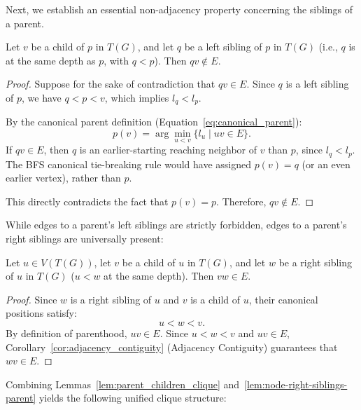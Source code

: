 Next, we establish an essential non-adjacency property concerning the siblings of a parent.

\begin{lemma}
\label{lem:child-left-sibling}
Let $v$ be a child of $p$ in $T(G)$, and let $q$ be a left sibling of $p$ in $T(G)$ (i.e., $q$ is at the same depth as $p$, with $q < p$). Then $qv \notin E$.
\end{lemma}
\begin{proof}
Suppose for the sake of contradiction that $qv \in E$. Since $q$ is a left sibling of $p$, we have $q < p < v$, which implies $l_q < l_p$. 

By the canonical parent definition (Equation~\eqref{eq:canonical_parent}):
\[
    p(v) = \arg\min_{u < v} \{ l_u \mid uv \in E \}.
\]
If $qv \in E$, then $q$ is an earlier-starting reaching neighbor of $v$ than $p$, since $l_q < l_p$. The BFS canonical tie-breaking rule would have assigned $p(v) = q$ (or an even earlier vertex), rather than $p$. 

This directly contradicts the fact that $p(v) = p$. Therefore, $qv \notin E$.
\end{proof}

While edges to a parent's left siblings are strictly forbidden, edges to a parent's right siblings are universally present:

\begin{lemma}
\label{lem:node-right-siblings-parent}
Let $u \in V(T(G))$, let $v$ be a child of $u$ in $T(G)$, and let $w$ be a right sibling of $u$ in $T(G)$ ($u < w$ at the same depth). Then $vw \in E$.
\end{lemma}
\begin{proof}
Since $w$ is a right sibling of $u$ and $v$ is a child of $u$, their canonical positions satisfy:
\[
    u < w < v.
\]
By definition of parenthood, $uv \in E$. Since $u < w < v$ and $uv \in E$, Corollary~\ref{cor:adjacency_contiguity} (Adjacency Contiguity) guarantees that $wv \in E$.
\end{proof}

Combining Lemmas~\ref{lem:parent_children_clique} and~\ref{lem:node-right-siblings-parent} yields the following unified clique structure:

